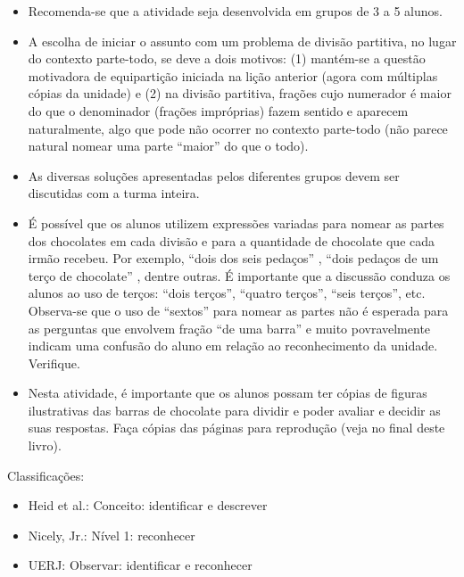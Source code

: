 \documentclass[oneside]{book}
\begin{document}
\begin{multicols}{2}
\begin{itemize} %
    \item       Recomenda-se que a atividade seja desenvolvida em grupos de 3 a 5 alunos.
    \item       A escolha de iniciar o assunto com um problema de divisão partitiva, no lugar do contexto parte-todo, se deve a dois motivos: (1) mantém-se a questão motivadora de equipartição iniciada na lição anterior (agora com múltiplas cópias da unidade) e (2) na divisão partitiva, frações cujo numerador é maior do que o denominador (frações impróprias) fazem sentido e aparecem naturalmente, algo que pode não ocorrer no contexto parte-todo (não parece natural nomear uma parte       ``maior''       do que o todo).
    \item       As diversas soluções apresentadas pelos diferentes grupos devem ser discutidas com a turma inteira.
    \item       É possível que os alunos utilizem expressões variadas para nomear as partes dos chocolates em cada divisão e para a quantidade de chocolate que cada irmão recebeu. Por exemplo,       ``dois dos seis pedaços''      ,       ``dois pedaços de um terço de chocolate''      , dentre outras. É importante que a discussão conduza os alunos ao uso de terços:       ``dois terços'',       ``quatro terços'',       ``seis terços'', etc. Observa-se que o uso de       ``sextos''       para nomear as partes não é esperada para as perguntas que envolvem fração       ``de uma barra''       e muito povravelmente indicam uma confusão do aluno em relação ao reconhecimento da unidade. Verifique.
    \item       Nesta atividade, é importante que os alunos possam ter cópias de figuras ilustrativas das barras de chocolate para dividir e poder avaliar e decidir as suas respostas. Faça cópias das páginas para reprodução (veja no final deste livro).
\end{itemize} %


  Classificações:
\begin{itemize} %
    \item       Heid et al.: Conceito: identificar e descrever
    \item       Nicely, Jr.: Nível 1: reconhecer
    \item       UERJ: Observar: identificar e reconhecer
\end{itemize} %


\end{multicols}
\end{document}
